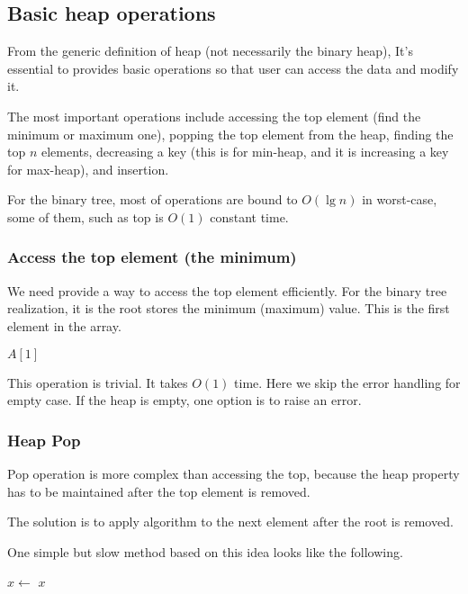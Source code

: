 \documentclass{article}
\begin{document}
\subsection{Basic heap operations}

From the generic definition of heap (not necessarily the binary heap),
It's essential to provides basic operations so that user can access
the data and modify it.

The most important operations include accessing the top element
(find the minimum or maximum one), popping the top element
from the heap, finding the top $n$ elements, decreasing a key (this
is for min-heap, and it is increasing a key for max-heap), and
insertion.

For the binary tree, most of operations are bound to $O(\lg n)$ in
worst-case, some of them, such as top is $O(1)$ constant time.

\subsubsection{Access the top element (the minimum)}
We need provide a way to access the top element efficiently.
For the binary tree realization, it is the
root stores the minimum (maximum) value. This is the first
element in the array.

\begin{algorithmic}[1]
  \State \Return $A[1]$
\EndFunction
\end{algorithmic}

This operation is trivial. It takes $O(1)$ time.
Here we skip the error handling for empty case. If the
heap is empty, one option is to raise an error.

\subsubsection{Heap Pop}

Pop operation is more
complex than accessing the top, because the heap property has to be maintained
after the top element is removed.

The solution is to apply  algorithm to the
next element after the root is removed.

One simple but slow method based on this idea looks like
the following.

\begin{algorithmic}[1]
  \State $x \gets$ 
  \State {}
    \State {}
  \EndIf
  \State \Return $x$
\EndFunction
\end{algorithmic}
\end{document}
